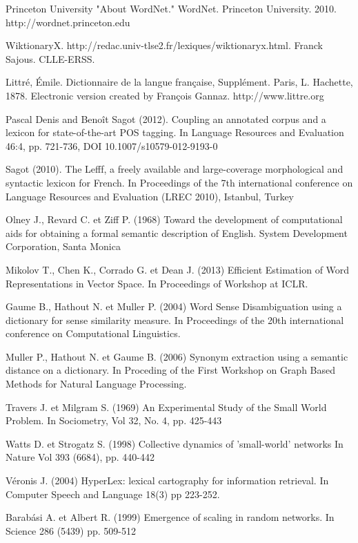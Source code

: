 \begin{thebibliography}{10}

Princeton University "About WordNet." WordNet. Princeton 
University. 2010. http://wordnet.princeton.edu \label{bib:wordnet}

WiktionaryX. 
http://redac.univ-tlse2.fr/lexiques/wiktionaryx.html. 
Franck Sajous. CLLE-ERSS. \label{bib:wikixml}

Littré, Émile. Dictionnaire de la langue française, 
Supplément. Paris, L. Hachette, 1878. Electronic version created by François 
Gannaz. http://www.littre.org \label{bib:littrexml}

Pascal Denis and Benoît Sagot (2012). Coupling an annotated 
corpus and a lexicon for state-of-the-art POS tagging. In Language Resources 
and Evaluation 46:4, pp. 721-736, DOI 10.1007/s10579-012-9193-0\label{bib:melt} 

Sagot (2010). The Lefff, a freely available and large-coverage 
morphological and syntactic lexicon for French. In Proceedings of the 7th 
international conference on Language Resources and Evaluation (LREC 2010), 
Istanbul, Turkey\label{bib:lefff} 

Olney J., Revard C. et Ziff P. (1968) Toward the development
 of computational aids for obtaining a formal semantic description of English.
System Development Corporation, Santa Monica\label{bib:olnyetal} 


Mikolov T., Chen K., Corrado G. et Dean J. (2013)
Efficient Estimation of Word Representations in Vector Space. In
Proceedings of Workshop at ICLR.\label{bib:word2vec} 

Gaume B., Hathout N. et Muller P. (2004)
Word Sense Disambiguation using a dictionary for sense similarity measure.
In Proceedings of the 20th international conference on Computational
Linguistics.\label{bib:gaumeetal} 

Muller P., Hathout N. et Gaume B. (2006)
Synonym extraction using a semantic distance on a dictionary.
In Proceding of the First Workshop on Graph Based Methods for
Natural Language Processing.\label{bib:mulleretal} 

Travers J. et Milgram S. (1969)
An Experimental Study of the Small World Problem.
In Sociometry, Vol 32, No. 4, pp. 425-443\label{bib:traversmilgram} 

Watts D. et Strogatz S. (1998)
Collective dynamics of 'small-world' networks
In Nature Vol 393 (6684), pp. 440-442 \label{bib:wattsstrogatz} 

Véronis J. (2004)
HyperLex: lexical cartography for information retrieval.
In Computer Speech and Language 18(3) pp 223-252. \label{bib:veronis} 

Barabási A. et Albert R. (1999)
Emergence of scaling in random networks.
In Science 286 (5439) pp. 509-512 \label{bib:barabasi} 

\end{thebibliography}
